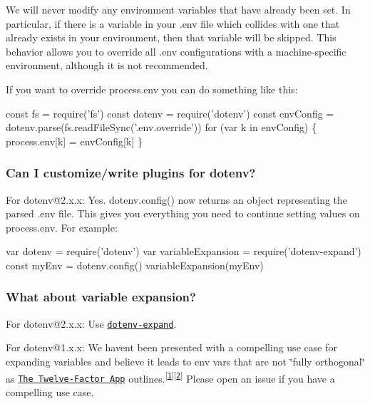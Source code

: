 We will never modify any environment variables that have already been set. In particular, if there is a variable in your {\ttfamily .env} file which collides with one that already exists in your environment, then that variable will be skipped. This behavior allows you to override all {\ttfamily .env} configurations with a machine-\/specific environment, although it is not recommended.

If you want to override {\ttfamily process.\+env} you can do something like this\+:


\begin{DoxyCode}
const fs = require('fs')
const dotenv = require('dotenv')
const envConfig = dotenv.parse(fs.readFileSync('.env.override'))
for (var k in envConfig) \{
  process.env[k] = envConfig[k]
\}
\end{DoxyCode}


\subsubsection*{Can I customize/write plugins for dotenv?}

For {\ttfamily dotenv@2.\+x.\+x}\+: Yes. {\ttfamily dotenv.\+config()} now returns an object representing the parsed {\ttfamily .env} file. This gives you everything you need to continue setting values on {\ttfamily process.\+env}. For example\+:


\begin{DoxyCode}
var dotenv = require('dotenv')
var variableExpansion = require('dotenv-expand')
const myEnv = dotenv.config()
variableExpansion(myEnv)
\end{DoxyCode}


\subsubsection*{What about variable expansion?}

For {\ttfamily dotenv@2.\+x.\+x}\+: Use \href{https://github.com/motdotla/dotenv-expand}{\tt dotenv-\/expand}.

For {\ttfamily dotenv@1.\+x.\+x}\+: We haven\textquotesingle{}t been presented with a compelling use case for expanding variables and believe it leads to env vars that are not \char`\"{}fully orthogonal\char`\"{} as \href{http://12factor.net/config}{\tt The Twelve-\/\+Factor App} outlines.\textsuperscript{\mbox{[}\href{https://github.com/motdotla/dotenv/issues/39}{\tt 1}\mbox{]}\mbox{[}\href{https://github.com/motdotla/dotenv/pull/97}{\tt 2}\mbox{]}} Please open an issue if you have a compelling use case.

